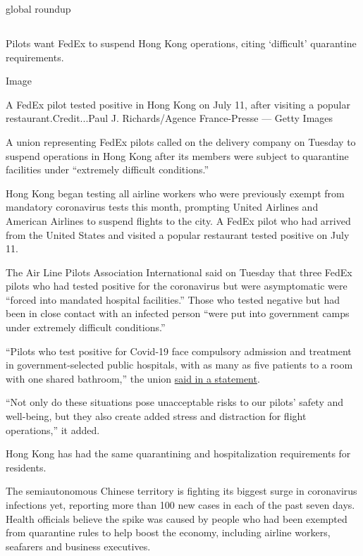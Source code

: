 global roundup

\hypertarget{-11}{%
\subsection{}\label{-11}}

Pilots want FedEx to suspend Hong Kong operations, citing `difficult'
quarantine requirements.

Image

A FedEx pilot tested positive in Hong Kong on July 11, after visiting a
popular restaurant.Credit...Paul J. Richards/Agence France-Presse ---
Getty Images

A union representing FedEx pilots called on the delivery company on
Tuesday to suspend operations in Hong Kong after its members were
subject to quarantine facilities under ``extremely difficult
conditions.''

Hong Kong began testing all airline workers who were previously exempt
from mandatory coronavirus tests this month, prompting United Airlines
and American Airlines to suspend flights to the city. A FedEx pilot who
had arrived from the United States and visited a popular restaurant
tested positive on July 11.

The Air Line Pilots Association International said on Tuesday that three
FedEx pilots who had tested positive for the coronavirus but were
asymptomatic were ``forced into mandated hospital facilities.'' Those
who tested negative but had been in close contact with an infected
person ``were put into government camps under extremely difficult
conditions.''

``Pilots who test positive for Covid-19 face compulsory admission and
treatment in government-selected public hospitals, with as many as five
patients to a room with one shared bathroom,'' the union
\href{https://www.alpa.org/news-and-events/news-room/2020-07-28-fedex-pilots-face-unacceptable-conditions-in-hong-kong}{said
in a statement}.

``Not only do these situations pose unacceptable risks to our pilots'
safety and well-being, but they also create added stress and distraction
for flight operations,'' it added.

Hong Kong has had the same quarantining and hospitalization requirements
for residents.

The semiautonomous Chinese territory is fighting its biggest surge in
coronavirus infections yet, reporting more than 100 new cases in each of
the past seven days. Health officials believe the spike was caused by
people who had been exempted from quarantine rules to help boost the
economy, including airline workers, seafarers and business executives.

